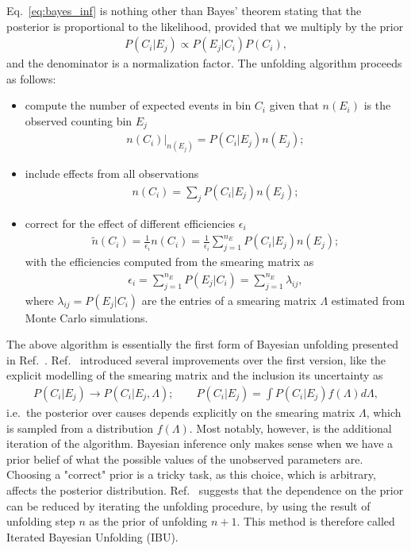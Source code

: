 Eq.~\ref{eq:bayes_inf} is nothing other than Bayes' theorem stating that the posterior is proportional to the likelihood, provided that we multiply by the prior
%
\begin{align}
P(C_i | E_j) \propto P(E_j | C_i) P(C_i),
\end{align}
%
and the denominator is a normalization factor.
The unfolding algorithm proceeds as follows:
\begin{itemize}
\item
compute the number of expected events in bin $C_i$ given that $n(E_i)$ is the observed counting bin $E_j$\\
\begin{align}
n(C_i)|_{n(E_j)} = P(C_i | E_j) n(E_j);
\end{align}
\item
include effects from all observations\\
\begin{align}
n(C_i) = \sum_j P(C_i | E_j) n(E_j);
\end{align}
\item
correct for the effect of different efficiencies $\epsilon_i$\\
\begin{align}\label{eq:IBU}
\tilde{n}(C_i) = \frac{1}{\epsilon_i} n(C_i) = \frac{1}{\epsilon_i}\sum_{j=1}^{n_E} P(C_i | E_j) n(E_j);
\end{align}
with the efficiencies computed from the smearing matrix as
\begin{align}
\epsilon_i = \sum_{j=1}^{n_E} P(E_j | C_i) = \sum_{j=1}^{n_E} \lambda_{ij},
\end{align}
where $\lambda_{ij} = P(E_j | C_i)$ are the entries of a smearing matrix $\Lambda$ estimated from Monte Carlo simulations. 
\end{itemize}

The above algorithm is essentially the first form of Bayesian unfolding presented in Ref.~\cite{DAgostini:1994fjx}. Ref.~\cite{dagostini2010improved} introduced several improvements over the first version, like the explicit modelling of the smearing matrix and the inclusion its uncertainty as
%
\begin{align}
P(C_i | E_j) \longrightarrow P(C_i | E_j, \Lambda); \qquad P(C_i | E_j) = \int P(C_i | E_j) f(\Lambda) d\Lambda,
\end{align}
%
i.e.\ the posterior over causes depends explicitly on the smearing matrix $\Lambda$, which is sampled from a distribution $f(\Lambda)$.
Most notably, however, is the additional iteration of the algorithm. Bayesian inference only makes sense when we have a prior belief of what the possible values of the unobserved parameters are. Choosing a "correct" prior is a tricky task, as this choice, which is arbitrary, affects the posterior distribution.
Ref.~\cite{dagostini2010improved} suggests that the dependence on the prior can be reduced by iterating the unfolding procedure, by using the result of unfolding step $n$ as the prior of unfolding $n+1$. This method is therefore called Iterated Bayesian Unfolding (IBU).

